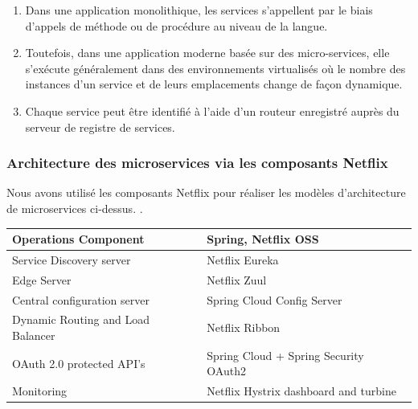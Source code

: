 \begin{itemize}
\begin{enumerate}
\item   Dans une application monolithique, les services s'appellent par le biais d'appels de méthode ou de procédure au niveau de la langue.

\item   Toutefois, dans une application moderne basée sur des micro-services, elle s'exécute généralement dans des environnements virtualisés où le nombre
des instances d'un service et de leurs emplacements change de façon dynamique.

\item   Chaque service peut être identifié à l'aide d'un routeur enregistré auprès du serveur de registre de services.
	
\end{enumerate}
\end{itemize}



\subsubsection{Architecture des microservices via les composants Netflix}
Nous avons utilisé les composants Netflix pour réaliser les modèles d’architecture de microservices ci-dessus. \cite{MicroServices}.

\begin{table}[H]
	\begin{tabular}{|l|l|}
		\hline
		\rowcolor[HTML]{5174DA} 
		{\color[HTML]{FFFFFF} \textbf{Operations Component}} & {\color[HTML]{FFFFFF} \textbf{Spring, Netflix OSS}} \\ \hline
		Service Discovery server & Netflix Eureka \\ \hline
		Edge Server & Netflix Zuul \\ \hline
		Central configuration server & Spring Cloud Config Server \\ \hline
		Dynamic Routing and Load Balancer & Netflix Ribbon \\ \hline
		OAuth 2.0 protected API’s & Spring Cloud + Spring Security OAuth2 \\ \hline
		Monitoring & Netflix Hystrix dashboard and turbine \\ \hline
	\end{tabular}
\end{table}

